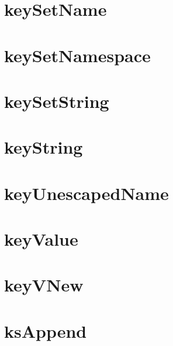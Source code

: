 \let\mypdfximage\pdfximage\def\pdfximage{\immediate\mypdfximage}\documentclass[twoside]{book}
\newcommand{\+}{\discretionary{\mbox{\scriptsize$\hookleftarrow$}}{}{}}
\begin{document}
\chapter{key\+Set\+Name}
\label{doc_contrib_api_reviews_core_keySetName_md}

\chapter{key\+Set\+Namespace}
\label{doc_contrib_api_reviews_core_keySetNamespace_md}

\chapter{key\+Set\+String}
\label{doc_contrib_api_reviews_core_keySetString_md}

\chapter{key\+String}
\label{doc_contrib_api_reviews_core_keyString_md}

\chapter{key\+Unescaped\+Name}
\label{doc_contrib_api_reviews_core_keyUnescapedName_md}

\chapter{key\+Value}
\label{doc_contrib_api_reviews_core_keyValue_md}

\chapter{key\+VNew}
\label{doc_contrib_api_reviews_core_keyVNew_md}

\chapter{ks\+Append}
\label{doc_contrib_api_reviews_core_ksAppend_md}

\end{document}
